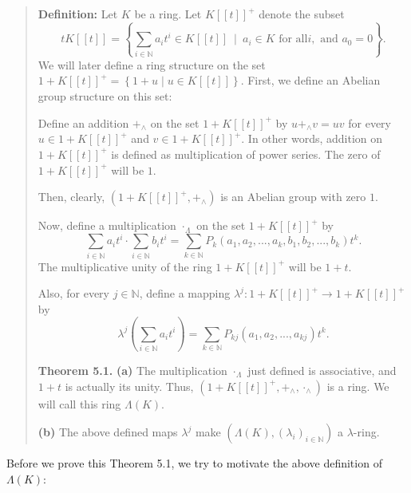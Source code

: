 \documentclass[12pt,final,notitlepage,onecolumn,german]{article}%
\begin{document}
\begin{quote}
\textbf{Definition:} Let $K$ be a ring. Let $K\left[  \left[  t\right]
\right]  ^{+}$ denote the subset%
\[
tK\left[  \left[  t\right]  \right]  =\left\{  \sum_{i\in\mathbb{N}}a_{i}%
t^{i}\in K\left[  \left[  t\right]  \right]  \ \mid\ a_{i}\in K\text{ for all
}i,\text{ and }a_{0}=0\right\}  .
\]
We will later define a ring structure on the set $1+K\left[  \left[  t\right]
\right]  ^{+}=\left\{  1+u\mid u\in K\left[  \left[  t\right]  \right]
\right\}  $. First, we define an Abelian group structure on this set:

Define an addition $+_{\wedge}$ on the set $1+K\left[  \left[  t\right]
\right]  ^{+}$ by $u+_{\wedge}v=uv$ for every $u\in1+K\left[  \left[
t\right]  \right]  ^{+}$ and $v\in1+K\left[  \left[  t\right]  \right]  ^{+}$.
In other words, addition on $1+K\left[  \left[  t\right]  \right]  ^{+}$ is
defined as multiplication of power series. The zero of $1+K\left[  \left[
t\right]  \right]  ^{+}$ will be $1$.

Then, clearly, $\left(  1+K\left[  \left[  t\right]  \right]  ^{+},+_{\wedge
}\right)  $ is an Abelian group with zero $1$.

Now, define a multiplication $\cdot_{\Lambda}$ on the set $1+K\left[  \left[
t\right]  \right]  ^{+}$ by%
\[
\sum_{i\in\mathbb{N}}a_{i}t^{i}\cdot\sum_{i\in\mathbb{N}}b_{i}t^{i}=\sum
_{k\in\mathbb{N}}P_{k}\left(  a_{1},a_{2},...,a_{k},b_{1},b_{2},...,b_{k}%
\right)  t^{k}.
\]
The multiplicative unity of the ring $1+K\left[  \left[  t\right]  \right]
^{+}$ will be $1+t$.

Also, for every $j\in\mathbb{N}$, define a mapping $\lambda^{j}:1+K\left[
\left[  t\right]  \right]  ^{+}\rightarrow1+K\left[  \left[  t\right]
\right]  ^{+}$ by%
\[
\lambda^{j}\left(  \sum_{i\in\mathbb{N}}a_{i}t^{i}\right)  =\sum
_{k\in\mathbb{N}}P_{kj}\left(  a_{1},a_{2},...,a_{kj}\right)  t^{k}.
\]


\textbf{Theorem 5.1.} \textbf{(a)} The multiplication $\cdot_{\Lambda}$ just
defined is associative, and $1+t$ is actually its unity. Thus, $\left(
1+K\left[  \left[  t\right]  \right]  ^{+},+_{\wedge},\cdot_{\wedge}\right)  $
is a ring. We will call this ring $\Lambda\left(  K\right)  $.

\textbf{(b)} The above defined maps $\lambda^{j}$ make $\left(  \Lambda\left(
K\right)  ,\left(  \lambda_{i}\right)  _{i\in\mathbb{N}}\right)  $ a $\lambda$-ring.
\end{quote}

Before we prove this Theorem 5.1, we try to motivate the above definition of
$\Lambda\left(  K\right)  $:
\end{document}
